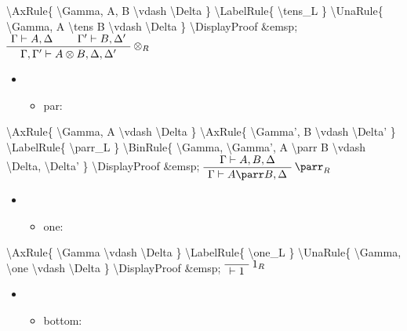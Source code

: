 \textbackslash{}AxRule\{ \textbackslash{}Gamma, A, B
\textbackslash{}vdash \textbackslash{}Delta \}
\textbackslash{}LabelRule\{ \textbackslash{}tens\_L \}
\textbackslash{}UnaRule\{ \textbackslash{}Gamma, A \textbackslash{}tens
B \textbackslash{}vdash \textbackslash{}Delta \}
\textbackslash{}DisplayProof \&emsp;
\(\AxRule{ \Gamma \vdash A, \Delta }
\AxRule{ \Gamma' \vdash B, \Delta' }
\LabelRule{ \tens_R }
\BinRule{ \Gamma, \Gamma' \vdash A \tens B, \Delta, \Delta' }
\DisplayProof\)

\begin{itemize}
\item
  \begin{itemize}
  \tightlist
  \item
    par: 
  \end{itemize}
\end{itemize}

\textbackslash{}AxRule\{ \textbackslash{}Gamma, A \textbackslash{}vdash
\textbackslash{}Delta \} \textbackslash{}AxRule\{
\textbackslash{}Gamma', B \textbackslash{}vdash \textbackslash{}Delta'
\} \textbackslash{}LabelRule\{ \textbackslash{}parr\_L \}
\textbackslash{}BinRule\{ \textbackslash{}Gamma, \textbackslash{}Gamma',
A \textbackslash{}parr B \textbackslash{}vdash \textbackslash{}Delta,
\textbackslash{}Delta' \} \textbackslash{}DisplayProof \&emsp;
\(\AxRule{ \Gamma \vdash A, B, \Delta }
\LabelRule{ \parr_R }
\UnaRule{ \Gamma \vdash A \parr B, \Delta }
\DisplayProof\)

\begin{itemize}
\item
  \begin{itemize}
  \tightlist
  \item
    one: 
  \end{itemize}
\end{itemize}

\textbackslash{}AxRule\{ \textbackslash{}Gamma \textbackslash{}vdash
\textbackslash{}Delta \} \textbackslash{}LabelRule\{
\textbackslash{}one\_L \} \textbackslash{}UnaRule\{
\textbackslash{}Gamma, \textbackslash{}one \textbackslash{}vdash
\textbackslash{}Delta \} \textbackslash{}DisplayProof \&emsp;
\(\LabelRule{ \one_R }
\NulRule{ \vdash \one }
\DisplayProof\)

\begin{itemize}
\item
  \begin{itemize}
  \tightlist
  \item
    bottom: 
  \end{itemize}
\end{itemize}

